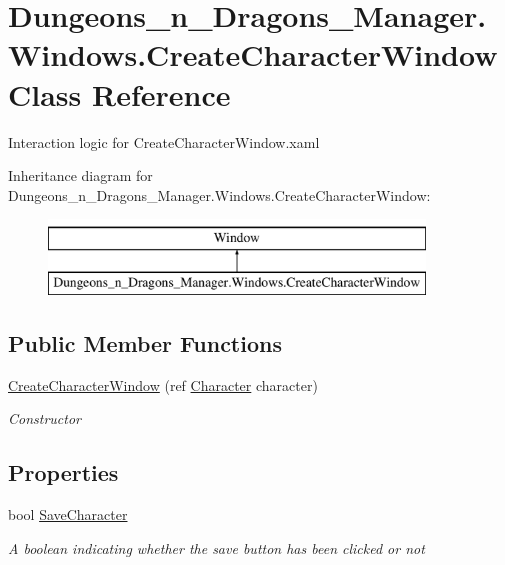 \hypertarget{class_dungeons__n___dragons___manager_1_1_windows_1_1_create_character_window}{}\section{Dungeons\+\_\+n\+\_\+\+Dragons\+\_\+\+Manager.\+Windows.\+Create\+Character\+Window Class Reference}
\label{class_dungeons__n___dragons___manager_1_1_windows_1_1_create_character_window}


Interaction logic for Create\+Character\+Window.\+xaml  


Inheritance diagram for Dungeons\+\_\+n\+\_\+\+Dragons\+\_\+\+Manager.\+Windows.\+Create\+Character\+Window\+:\begin{figure}[H]
\begin{center}
\leavevmode
\includegraphics[height=2.000000cm]{class_dungeons__n___dragons___manager_1_1_windows_1_1_create_character_window}
\end{center}
\end{figure}
\subsection*{Public Member Functions}
\begin{DoxyCompactItemize}
\item 
\mbox{\hyperlink{class_dungeons__n___dragons___manager_1_1_windows_1_1_create_character_window_ad28df073ed278960a647204c5d82e42d}{Create\+Character\+Window}} (ref \mbox{\hyperlink{class_dungeons__n___dragons___manager_1_1_models_1_1_character}{Character}} character)
\begin{DoxyCompactList}\small\item\em Constructor \end{DoxyCompactList}\end{DoxyCompactItemize}
\subsection*{Properties}
\begin{DoxyCompactItemize}
\item 
bool \mbox{\hyperlink{class_dungeons__n___dragons___manager_1_1_windows_1_1_create_character_window_ac78bc34ab0533d01b2fd332ac32f9d41}{Save\+Character}}
\begin{DoxyCompactList}\small\item\em A boolean indicating whether the save button has been clicked or not \end{DoxyCompactList}\end{DoxyCompactItemize}
